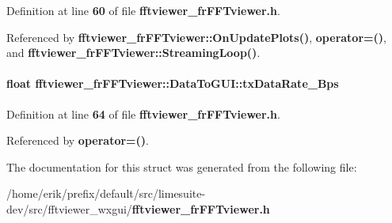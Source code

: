 Definition at line {\bf 60} of file {\bf fftviewer\+\_\+fr\+F\+F\+Tviewer.\+h}.



Referenced by {\bf fftviewer\+\_\+fr\+F\+F\+Tviewer\+::\+On\+Update\+Plots()}, {\bf operator=()}, and {\bf fftviewer\+\_\+fr\+F\+F\+Tviewer\+::\+Streaming\+Loop()}.

\paragraph[{tx\+Data\+Rate\+\_\+\+Bps}]{\setlength{\rightskip}{0pt plus 5cm}float fftviewer\+\_\+fr\+F\+F\+Tviewer\+::\+Data\+To\+G\+U\+I\+::tx\+Data\+Rate\+\_\+\+Bps}\label{structfftviewer__frFFTviewer_1_1DataToGUI_a86b4f364102f494cad6bfc673b9d2099}


Definition at line {\bf 64} of file {\bf fftviewer\+\_\+fr\+F\+F\+Tviewer.\+h}.



Referenced by {\bf operator=()}.



The documentation for this struct was generated from the following file\+:\begin{DoxyCompactItemize}
\item 
/home/erik/prefix/default/src/limesuite-\/dev/src/fftviewer\+\_\+wxgui/{\bf fftviewer\+\_\+fr\+F\+F\+Tviewer.\+h}\end{DoxyCompactItemize}
